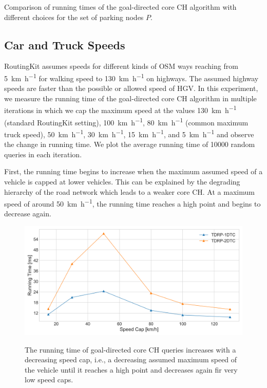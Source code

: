 \begin{table}[hbtp]
	\centering
	
	\caption{Comparison of running times of the goal-directed core CH algorithm with different choices for the set of parking nodes $P$.}
	\label{tbl:parking_set_times}
\end{table}

\subsection{Car and Truck Speeds}
RoutingKit assumes speeds for different kinds of OSM ways reaching from \SI[per-mode = symbol]{5}{\kilo\meter\per\hour} for walking speed to \SI[per-mode = symbol]{130}{\kilo\meter\per\hour} on highways. The assumed highway speeds are faster than the possible or allowed speed of HGV. In this experiment, we measure the running time of the goal-directed core CH algorithm in multiple iterations in which we cap the maximum speed at the values \SI[per-mode = symbol]{130}{\kilo\meter\per\hour} (standard RoutingKit setting), \SI[per-mode = symbol]{100}{\kilo\meter\per\hour}, \SI[per-mode = symbol]{80}{\kilo\meter\per\hour} (common maximum truck speed), \SI[per-mode = symbol]{50}{\kilo\meter\per\hour}, \SI[per-mode = symbol]{30}{\kilo\meter\per\hour}, \SI[per-mode = symbol]{15}{\kilo\meter\per\hour}, and \SI[per-mode = symbol]{5}{\kilo\meter\per\hour} and observe the change in running time. We plot the average running time of \num{10000} random queries in each iteration.

First, the running time begins to increase when the maximum assumed speed of a vehicle is capped at lower vehicles. This can be explained by the degrading hierarchy of the road network which leads to a weaker core CH. At a maximum speed of around \SI[per-mode = symbol]{50}{\kilo\meter\per\hour}, the running time reaches a high point and begins to decrease again.

\begin{figure}[hbtp]
	\centering
	\includegraphics[width=.95\textwidth]{plots/thesis_speed_cap.png}
	\label{fig:truck_speed_limit}
	\caption{The running time of goal-directed core CH queries increases with a decreasing speed cap, i.e., a decreasing assumed maximum speed of the vehicle until it reaches a high point and decreases again fir very low speed caps.}
\end{figure}


